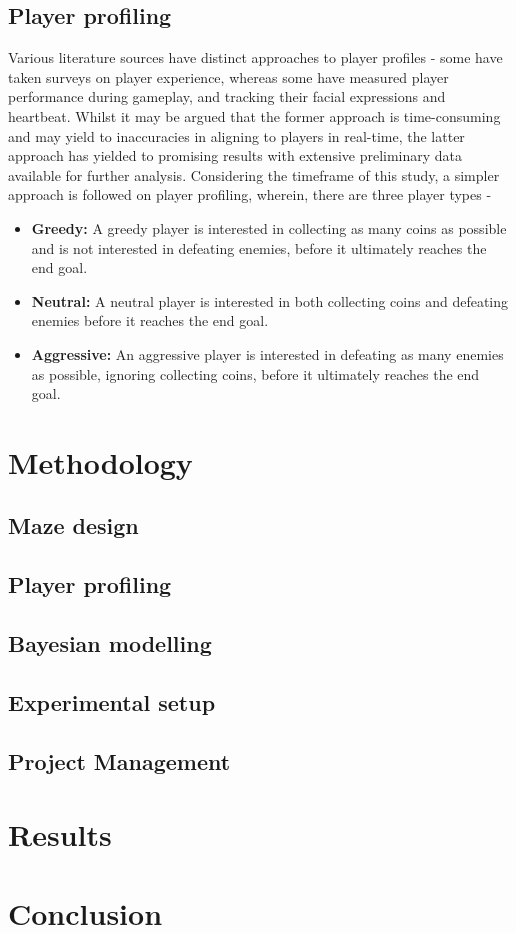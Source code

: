 \documentclass[sigconf]{IEEEtran}
\begin{document}
\subsection{Player profiling}
Various literature sources have distinct approaches to player profiles - some have taken surveys on player experience, whereas some have measured player performance during gameplay, and tracking their facial expressions and heartbeat. Whilst it may be argued that the former approach is time-consuming and may yield to inaccuracies in aligning to players in real-time, the latter approach has yielded to promising results with extensive preliminary data available for further analysis. Considering the timeframe of this study, a simpler approach is followed on player profiling, wherein, there are three player types -
\begin{itemize}
    \item \textbf{Greedy: } A greedy player is interested in collecting as many coins as possible and is not interested in defeating enemies, before it ultimately reaches the end goal.
    \item \textbf{Neutral: } A neutral player is interested in both collecting coins and defeating enemies before it reaches the end goal.
    \item \textbf{Aggressive: } An aggressive player is interested in defeating as many enemies as possible, ignoring collecting coins, before it ultimately reaches the end goal.
\end{itemize}

\section{Methodology}
\blindtext
\subsection{Maze design}
\subsection{Player profiling}
\subsection{Bayesian modelling}
\subsection{Experimental setup}
\subsection{Project Management}

\section{Results}
\blindtext

\section{Conclusion}
\blindtext
\end{document}
